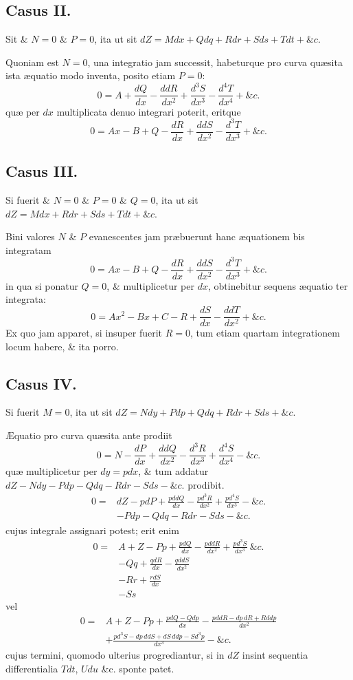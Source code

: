 \subsection*{Casus II.}
Sit \& $N=0$ \& $P=0$, ita ut sit $dZ=Mdx+Qdq+Rdr+Sds+Tdt+\&c.$

Quoniam est $N=0$, una integratio jam successit, habeturque pro curva quæsita ista æquatio modo inventa, posito etiam $P=0$:
\[0=A+\frac{dQ}{dx}-\frac{ddR}{dx^2}+\frac{d^3S}{dx^3}-\frac{d^4T}{dx^4}+\&c.\]
quæ per $dx$ multiplicata denuo integrari poterit, eritque
\[0=Ax-B+Q-\frac{dR}{dx}+\frac{ddS}{dx^2}-\frac{d^3T}{dx^3}+\&c.\]

\subsection*{Casus III.}
Si fuerit \& $N=0$ \& $P=0$ \& $Q=0$, ita ut sit $dZ=Mdx+Rdr+Sds+Tdt+\&c.$

Bini valores $N$ \& $P$ evanescentes jam præbuerunt hanc æquationem bis integratam
\[0=Ax-B+Q-\frac{dR}{dx}+\frac{ddS}{dx^2}-\frac{d^3T}{dx^3}+\&c.\]
in qua si ponatur $Q=0$, \& multiplicetur per $dx$, obtinebitur sequens æquatio ter integrata:
\[0=Ax^2-Bx+C-R+\frac{dS}{dx}-\frac{ddT}{dx^2}+\&c.\]
Ex quo jam apparet, si insuper fuerit $R=0$, tum etiam quartam integrationem locum habere, \& ita porro.

\subsection*{Casus IV.}
Si fuerit $M=0$, ita ut sit $dZ=Ndy+Pdp+Qdq+Rdr+Sds+\&c.$

Æquatio pro curva quæsita ante prodiit
\[0=N-\frac{dP}{dx}+\frac{ddQ}{dx^2}-\frac{d^3R}{dx^3}+\frac{d^4S}{dx^4}-\&c.\]
quæ multiplicetur per $dy=pdx$, \& tum addatur $dZ-Ndy-Pdp-Qdq-Rdr-Sds-\&c.$ prodibit.
\[\begin{aligned}
0={}&dZ-pdP+\frac{pddQ}{dx}-\frac{pd^3R}{dx^2}+\frac{pd^4S}{dx^3}-\&c.\\
&-Pdp-Qdq-Rdr-Sds-\&c.
\end{aligned}\]
cujus integrale assignari potest; erit enim
\[\begin{aligned}
0={}&A+Z-Pp+\frac{pdQ}{dx}-\frac{pddR}{dx^2}+\frac{pd^3S}{dx^3}\ \&c.\\
&-Qq+\frac{qdR}{dx}-\frac{qddS}{dx^2}\\
&-Rr+\frac{rdS}{dx}\\
&-Ss
\end{aligned}\]
vel
\[\begin{aligned}
0={}&A+Z-Pp+\frac{pdQ-Qdp}{dx}-\frac{pddR-dp\,dR+Rddp}{dx^2}\\
&+\frac{pd^3S-dp\,ddS+dS\,ddp-Sd^3p}{dx^3}-\&c.
\end{aligned}\]
cujus termini, quomodo ulterius progrediantur, si in $dZ$ insint sequentia differentialia $Tdt$, $Udu$ \&c. sponte patet.

